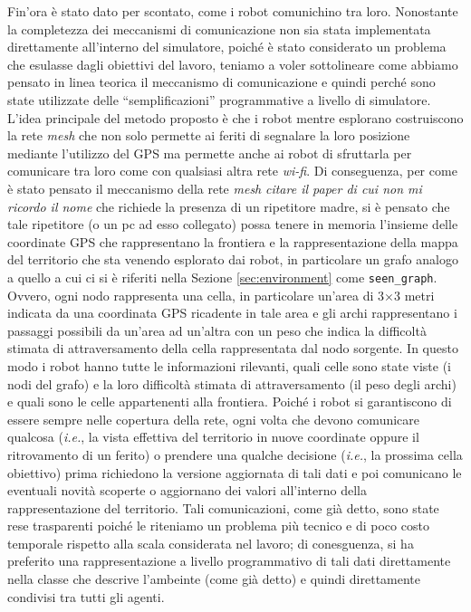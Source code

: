 Fin'ora è stato dato per scontato, come i robot comunichino tra loro.
Nonostante la completezza dei meccanismi di comunicazione non sia stata implementata direttamente all'interno del simulatore, poiché è stato considerato un problema che esulasse dagli obiettivi del lavoro, teniamo a voler sottolineare come abbiamo pensato in linea teorica il meccanismo di comunicazione e quindi perché sono state utilizzate delle “semplificazioni” programmative a livello di simulatore.
L'idea principale del metodo proposto è che i robot mentre esplorano costruiscono la rete \textit{mesh} che non solo permette ai feriti di segnalare la loro posizione mediante l'utilizzo del GPS ma permette anche ai robot di sfruttarla per comunicare tra loro come con qualsiasi altra rete \textit{wi-fi}.
Di conseguenza, per come è stato pensato il meccanismo della rete \textit{mesh} \textit{citare il paper di cui non mi ricordo il nome} che richiede la presenza di un ripetitore madre, si è pensato che tale ripetitore (o un pc ad esso collegato) possa tenere in memoria l'insieme delle coordinate GPS che rappresentano la frontiera e la rappresentazione della mappa del territorio che sta venendo esplorato dai robot, in particolare un grafo analogo a quello a cui ci si è riferiti nella Sezione \ref{sec:environment} come \texttt{seen\_graph}.
Ovvero, ogni nodo rappresenta una cella, in particolare un'area di 3$\times$3 metri indicata da una coordinata GPS ricadente in tale area e gli archi rappresentano i passaggi possibili da un'area ad un'altra con un peso che indica la difficoltà stimata di attraversamento della cella rappresentata dal nodo sorgente.
In questo modo i robot hanno tutte le informazioni rilevanti, quali celle sono state viste (i nodi del grafo) e la loro difficoltà stimata di attraversamento (il peso degli archi) e quali sono le celle appartenenti alla frontiera.
Poiché i robot si garantiscono di essere sempre nelle copertura della rete, ogni volta che devono comunicare qualcosa (\textit{i.e.}, la vista effettiva del territorio in nuove coordinate oppure il ritrovamento di un ferito) o prendere una qualche decisione (\textit{i.e.}, la prossima cella obiettivo) prima richiedono la versione aggiornata di tali dati e poi comunicano le eventuali novità scoperte o aggiornano dei valori all'interno della rappresentazione del territorio.
Tali comunicazioni, come già detto, sono state rese trasparenti poiché le riteniamo un problema più tecnico e di poco costo temporale rispetto alla scala considerata nel lavoro; di conesguenza, si ha preferito una rappresentazione a livello programmativo di tali dati direttamente nella classe che descrive l'ambeinte (come già detto) e quindi direttamente condivisi tra tutti gli agenti.

